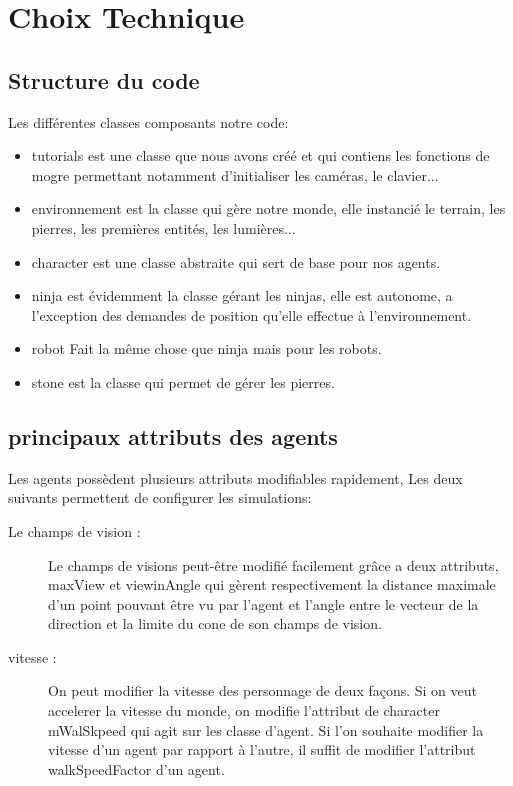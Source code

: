 \section{Choix Technique}
\thispagestyle{fancy}

\subsection{Structure du code}
Les différentes classes composants notre code:
\begin{itemize}
\item tutorials est une classe que nous avons créé et qui contiens les
  fonctions de mogre permettant notamment d'initialiser les caméras,
  le clavier...
\item environnement est la classe qui gère notre monde, elle instancié
  le terrain, les pierres, les premières entités, les lumières...
\item character est une classe abstraite qui sert de base pour nos
  agents.
\item ninja est évidemment la classe gérant les ninjas, elle est
  autonome, a l'exception des demandes de position qu'elle effectue à
  l'environnement.
\item robot Fait la même chose que ninja mais pour les robots.
\item stone est la classe qui permet de gérer les pierres. 
\end{itemize}

\subsection{principaux attributs des agents}

Les agents possèdent plusieurs attributs modifiables rapidement, Les
deux suivants permettent de configurer les simulations:

\begin{description}
\item[Le champs de vision :] Le champs de visions peut-être modifié
  facilement grâce a deux attributs, maxView et viewinAngle qui gèrent
  respectivement la distance maximale d'un point pouvant être vu par
  l'agent et l'angle entre le vecteur de la direction et la limite du
  cone de son champs de vision.
\item[vitesse :] On peut modifier la vitesse des personnage de deux
  façons. Si on veut accelerer la vitesse du monde, on modifie
  l'attribut de character mWalSkpeed qui agit sur les classe
  d'agent. Si l'on souhaite modifier la vitesse d'un agent par rapport
  à l'autre, il suffit de modifier l'attribut walkSpeedFactor d'un
  agent.
\end{description}

